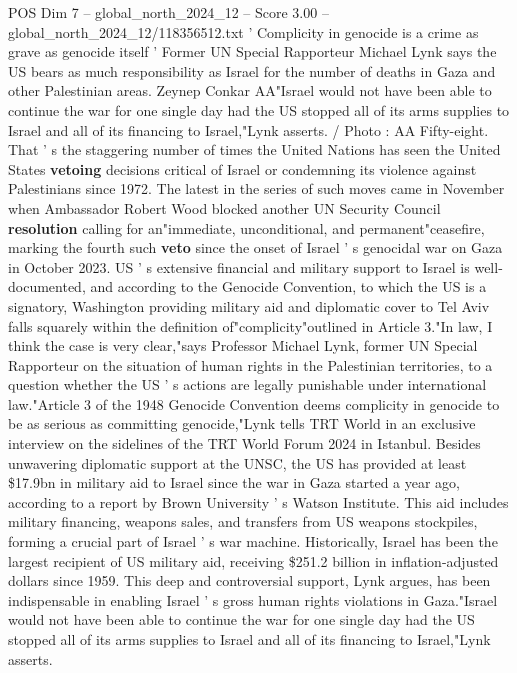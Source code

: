 \begin{textsample}{POS Dim 7 – global\_north\_2024\_12 – Score 3.00 – global\_north\_2024\_12/118356512.txt}  \label{ex:f7_pos_292}
' Complicity in genocide is a crime as grave as genocide itself ' Former UN Special Rapporteur Michael Lynk says the US bears as much responsibility as Israel for the number of deaths in Gaza and other Palestinian areas.
Zeynep Conkar AA"Israel would not have been able to continue the war for one single day had the US stopped all of its arms supplies to Israel and all of its financing to Israel,"Lynk asserts. / Photo : AA Fifty-eight.
That ' s the staggering number of times the United Nations has seen the United States \textbf{vetoing} decisions critical of Israel or condemning its violence against Palestinians since 1972.
The latest in the series of such moves came in November when Ambassador Robert Wood blocked another UN Security Council \textbf{resolution} calling for an"immediate, unconditional, and permanent"ceasefire, marking the fourth such \textbf{veto} since the onset of Israel ' s genocidal war on Gaza in October 2023.
US ' s extensive financial and military support to Israel is well-documented, and according to the Genocide Convention, to which the US is a signatory, Washington providing military aid and diplomatic cover to Tel Aviv falls squarely within the definition of"complicity"outlined in Article 3."In law, I think the case is very clear,"says Professor Michael Lynk, former UN Special Rapporteur on the situation of human rights in the Palestinian territories, to a question whether the US ' s actions are legally punishable under international law."Article 3 of the 1948 Genocide Convention deems complicity in genocide to be as serious as committing genocide,"Lynk tells TRT World in an exclusive interview on the sidelines of the TRT World Forum 2024 in Istanbul.
Besides unwavering diplomatic support at the UNSC, the US has provided at least \$17.9bn in military aid to Israel since the war in Gaza started a year ago, according to a report by Brown University ' s Watson Institute.
This aid includes military financing, weapons sales, and transfers from US weapons stockpiles, forming a crucial part of Israel ' s war machine.
Historically, Israel has been the largest recipient of US military aid, receiving \$251.2 billion in inflation-adjusted dollars since 1959.
This deep and controversial support, Lynk argues, has been indispensable in enabling Israel ' s gross human rights violations in Gaza."Israel would not have been able to continue the war for one single day had the US stopped all of its arms supplies to Israel and all of its financing to Israel,"Lynk asserts.

\end{textsample}
